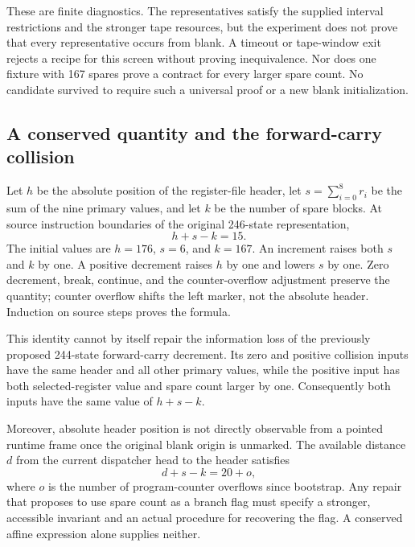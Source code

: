 These are finite diagnostics. The representatives satisfy the supplied
interval restrictions and the stronger tape resources, but the experiment
does not prove that every representative occurs from blank. A timeout or
tape-window exit rejects a recipe for this screen without proving inequivalence.
Nor does one fixture with 167 spares prove a contract for every larger spare
count. No candidate survived to require such a universal proof or a new blank
initialization.

\subsection{A conserved quantity and the forward-carry collision}

Let $h$ be the absolute position of the register-file header, let
$s=\sum_{i=0}^{8}r_i$ be the sum of the nine primary values, and let $k$ be
the number of spare blocks. At source instruction boundaries of the original
246-state representation,
\[
  h+s-k=15.
\]
The initial values are $h=176$, $s=6$, and $k=167$. An increment raises both
$s$ and $k$ by one. A positive decrement raises $h$ by one and lowers $s$ by
one. Zero decrement, break, continue, and the counter-overflow adjustment
preserve the quantity; counter overflow shifts the left marker, not the
absolute header. Induction on source steps proves the formula.

This identity cannot by itself repair the information loss of the previously
proposed 244-state forward-carry decrement. Its zero and positive collision
inputs have the same header and all other primary values, while the positive
input has both selected-register value and spare count larger by one.
Consequently both inputs have the same value of $h+s-k$.

Moreover, absolute header position is not directly observable from a pointed
runtime frame once the original blank origin is unmarked. The available
distance $d$ from the current dispatcher head to the header satisfies
\[
  d+s-k=20+o,
\]
where $o$ is the number of program-counter overflows since bootstrap.
Any repair that proposes to use spare count as a branch flag must specify a
stronger, accessible invariant and an actual procedure for recovering the
flag. A conserved affine expression alone supplies neither.
